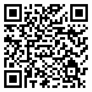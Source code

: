 \documentclass[../main.tex]{subfiles}
\begin{document}
\begin{tcolorbox}
\begin{minipage}[]{0.80\textwidth}
    \end{minipage}
    \hspace{0.1cm}
    \begin{minipage}[]{0.15\textwidth}
        \vspace{0.5cm}
        \includegraphics[width=\textwidth]{img/qr_code}
    \end{minipage}


\end{tcolorbox}
\end{document}

